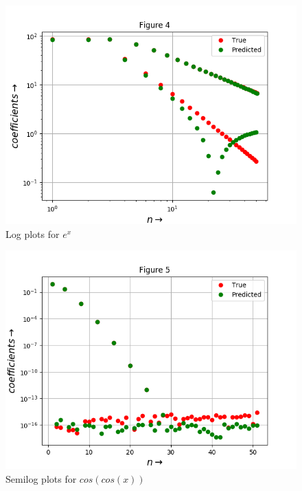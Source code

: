 \documentclass[11pt, a4paper]{article}
\begin{document}
   \begin{figure}[!tbh]
   	\centering
   	\includegraphics[scale=0.6]{Figure_8.png}   
   	\caption{Log plots for $e^{x}$}
   	\label{fig:sample}
   \end{figure} 
   
   \begin{figure}[!tbh]
   	\centering
   	\includegraphics[scale=0.6]{Figure_9.png}   
   	\caption{Semilog plots for $cos(cos(x))$}
   	\label{fig:sample}
   \end{figure} 
   
\end{document}
